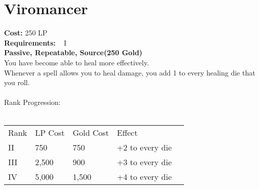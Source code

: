\section{Viromancer}\label{perk:viromancer}
\textbf{Cost:} 250 LP\\
\textbf{Requirements:} ~ I\\
\textbf{Passive, Repeatable, Source(250 Gold)}\\
You have become able to heal more effectively.\\
Whenever a spell allows you to heal damage, you add 1 to every healing die that you roll.\\
\\
Rank Progression:\\
\\
\begin{tabular}{l | l | l | l | l}
    Rank & LP Cost & Gold Cost &  Effect\\
    II & 750 & 750 & +2 to every die\\
    III & 2,500 & 900 & +3 to every die\\
    IV & 5,000 & 1,500 & +4 to every die\\
\end{tabular}